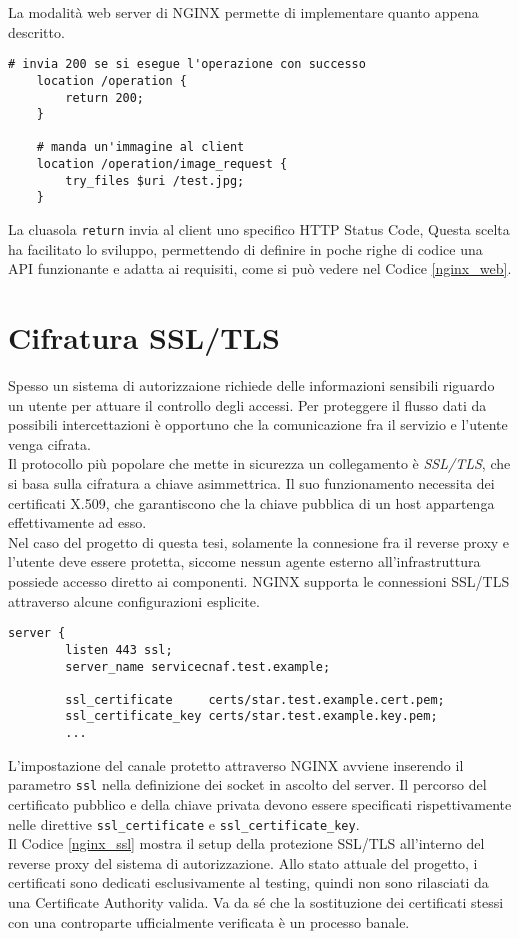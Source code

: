 La modalità web server di NGINX permette di implementare quanto appena descritto.
\lstset{language=nginx}
\begin{lstlisting}[caption={Frammento di codice del servizio applicativo.},captionpos=b,label=nginx_web]
    # invia 200 se si esegue l'operazione con successo
    location /operation {
        return 200;
    }

    # manda un'immagine al client
    location /operation/image_request {
        try_files $uri /test.jpg;
    }
\end{lstlisting}
La cluasola \texttt{return} invia al client uno specifico HTTP Status Code,  
Questa scelta ha facilitato lo sviluppo, permettendo di definire in poche righe di codice una API funzionante e adatta ai requisiti,  
come si può vedere nel Codice \ref*{nginx_web}.

\section{Cifratura SSL/TLS}
Spesso un sistema di autorizzaione richiede delle informazioni sensibili riguardo un utente per attuare il controllo 
degli accessi. 
Per proteggere il flusso dati da possibili intercettazioni è opportuno che la comunicazione fra il servizio e l'utente venga cifrata. 
\\ Il protocollo più popolare che mette in sicurezza un collegamento \newline è \textit{SSL/TLS}, che si basa sulla cifratura a chiave asimmettrica. Il suo funzionamento necessita 
dei certificati X.509, che garantiscono che la chiave pubblica di un host appartenga effettivamente ad esso. 
\\ Nel caso del progetto di questa tesi, solamente la connesione fra il reverse proxy e l'utente deve essere protetta, siccome nessun agente esterno
 all'infrastruttura possiede accesso diretto ai componenti.
NGINX supporta le connessioni SSL/TLS attraverso alcune configurazioni esplicite.

\begin{lstlisting}[caption={Configurazione di SSL},captionpos=b,label=nginx_ssl]
    server {
        listen 443 ssl;
        server_name servicecnaf.test.example;
        
        ssl_certificate     certs/star.test.example.cert.pem;
        ssl_certificate_key certs/star.test.example.key.pem;
        ...
\end{lstlisting}
L'impostazione del canale protetto attraverso NGINX avviene inserendo il parametro \texttt{ssl} nella definizione 
dei socket in ascolto del server. Il percorso del certificato pubblico e della chiave privata devono essere specificati 
rispettivamente nelle direttive \texttt{ssl\_certificate} e \texttt{ssl\_certificate\_key}. \\
Il Codice \ref*{nginx_ssl} mostra il setup della protezione SSL/TLS all'interno del reverse proxy del sistema di autorizzazione.
Allo stato attuale del progetto, i certificati sono dedicati esclusivamente al testing, quindi non sono rilasciati da 
una Certificate Authority valida. Va da sé che 
la sostituzione dei certificati stessi
con una controparte ufficialmente verificata è un processo banale.  


